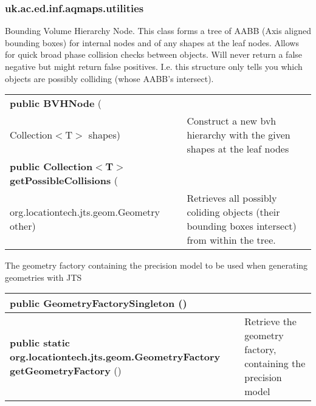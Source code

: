 \subsubsection{ uk.ac.ed.inf.aqmaps.utilities }
 { Bounding Volume Hierarchy Node. This class forms a tree of AABB (Axis aligned bounding boxes) for internal nodes\newline%
 and of any shapes at the leaf nodes. Allows for quick broad phase collision checks between objects. Will never return a false negative but might return\newline%
 false positives. I.e. this structure only tells you which objects are possibly colliding (whose AABB's intersect).
 
\begin{tabular}{ p{3in}|m{3.4in}}
\textbf{public BVHNode } (\\ \hspace*{ 5pt} Collection$<$T$>$ shapes) & Construct a new bvh hierarchy with the given shapes at the leaf nodes\\ \hline 
\textbf{public Collection$<$T$>$ getPossibleCollisions } (\\ \hspace*{ 5pt} org.locationtech.jts.geom.Geometry other) & Retrieves all possibly coliding objects (their bounding boxes intersect) from within the tree.\\ \hline 
\end{tabular}
}
 { The geometry factory containing the precision model to be used when generating geometries with JTS
 
\begin{tabular}{ p{3in}|m{3.4in}}
\textbf{public GeometryFactorySingleton} () & \\ \hline 
\textbf{public static org.locationtech.jts.geom.GeometryFactory getGeometryFactory} () & Retrieve the geometry factory, containing the precision model\\ \hline 
\end{tabular}
}
